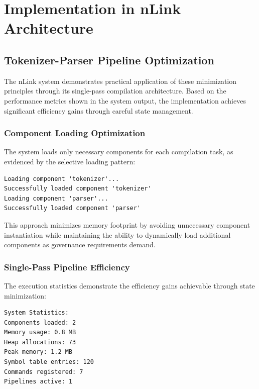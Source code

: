 \section{Implementation in nLink Architecture}

\subsection{Tokenizer-Parser Pipeline Optimization}

The nLink system demonstrates practical application of these minimization principles through its single-pass compilation architecture. Based on the performance metrics shown in the system output, the implementation achieves significant efficiency gains through careful state management.

\subsubsection{Component Loading Optimization}

The system loads only necessary components for each compilation task, as evidenced by the selective loading pattern:

\begin{lstlisting}[style=riftlang]
Loading component 'tokenizer'...
Successfully loaded component 'tokenizer'
Loading component 'parser'...
Successfully loaded component 'parser'
\end{lstlisting}

This approach minimizes memory footprint by avoiding unnecessary component instantiation while maintaining the ability to dynamically load additional components as governance requirements demand.

\subsubsection{Single-Pass Pipeline Efficiency}

The execution statistics demonstrate the efficiency gains achievable through state minimization:

\begin{lstlisting}[style=riftlang]
System Statistics:
Components loaded: 2
Memory usage: 0.8 MB
Heap allocations: 73
Peak memory: 1.2 MB
Symbol table entries: 120
Commands registered: 7
Pipelines active: 1
\end{lstlisting}

